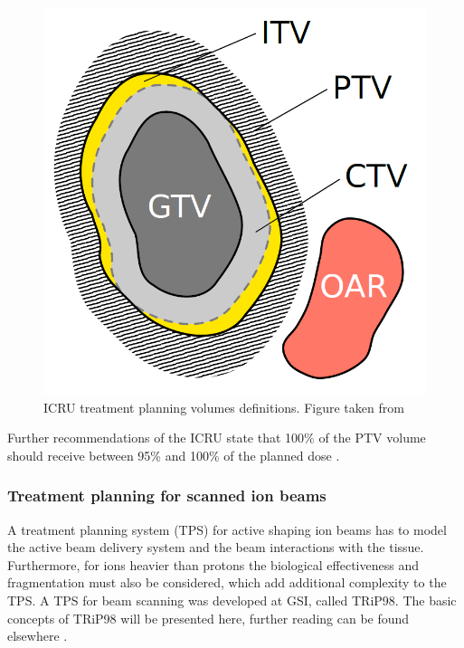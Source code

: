 \begin{figure}[H]
\begin{center}
\includegraphics[scale=0.3]{./Fundamentals/Images/volumes.png}
\caption{ICRU treatment planning volumes definitions. Figure taken from \cite{Richter2012}}
\label{targets}
\end{center}
\end{figure}

Further recommendations of the ICRU state that 100\% of the PTV volume should receive between 95\% and 100\% of the planned dose \cite{ICRU50}.


\subsubsection{Treatment planning for scanned ion beams}

A treatment planning system (TPS) for active shaping ion beams has to model the active beam delivery system and the beam interactions with the tissue. Furthermore, for ions heavier than protons
the biological effectiveness and fragmentation must also be considered, which add additional complexity to the TPS. A TPS for beam scanning was developed at GSI, called TRiP98. The basic concepts of TRiP98 will be
presented here, further reading can be found elsewhere \cite{Kraemer2000,Kraemer2000a, Richter2013}.

